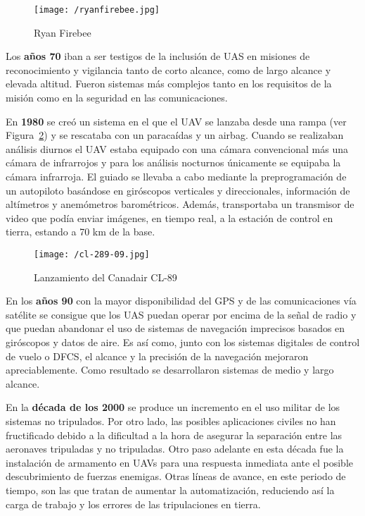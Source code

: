 \begin{figure}[!h]
\begin{center}
\texttt{[image: /ryanfirebee.jpg]}
\caption[Ryan Firebee]{Ryan Firebee}
\label{fig:ryanfirebee}
\end{center}
\end{figure}

Los \textbf{años 70} iban a ser testigos de la inclusión de \acs{UAS} en misiones de 
reconocimiento y vigilancia tanto de corto alcance, como de largo alcance y elevada altitud. Fueron sistemas 
más complejos tanto en los requisitos de la misión como en la seguridad en las comunicaciones.

En \textbf{1980} se creó un sistema en el que el \acs{UAV} se lanzaba desde una rampa (ver Figura~\ref{fig:cl89}) y se rescataba con un paracaídas y un airbag. 
Cuando se realizaban análisis diurnos el \acs{UAV} estaba equipado con una cámara convencional más una cámara de infrarrojos y para los análisis nocturnos únicamente se equipaba la cámara infrarroja. El guiado se llevaba a cabo mediante la preprogramación de un autopiloto basándose en giróscopos verticales y direccionales, información de altímetros y anemómetros barométricos. 
Además, transportaba un transmisor de video que podía enviar imágenes, en tiempo real, a la estación de control 
en tierra, estando a 70 km de la base.

\begin{figure}[!h]
\begin{center}
\texttt{[image: /cl-289-09.jpg]}
\caption[Lanzamiento del Canadair CL-89]{Lanzamiento del Canadair CL-89}
\label{fig:cl89}
\end{center}
\end{figure}

En los \textbf{años 90} con la mayor disponibilidad del \acs{GPS} y de las comunicaciones vía satélite se consigue que los \acs{UAS} puedan operar por encima de la señal de radio y que puedan abandonar el uso de sistemas de navegación imprecisos basados en giróscopos y
datos de aire. Es así como, junto con los sistemas digitales de control de vuelo o \acs{DFCS}, el alcance y la precisión de la navegación mejoraron apreciablemente. 
Como resultado se desarrollaron sistemas de medio y largo alcance. 

En la \textbf{década de los 2000} se produce un incremento en el uso militar de los sistemas no tripulados. 
Por otro lado, las posibles aplicaciones civiles no han fructificado debido a la dificultad a la hora de asegurar la 
separación entre las aeronaves tripuladas y no tripuladas.
Otro paso adelante en esta década fue la instalación de armamento en \acs{UAV}s para una respuesta inmediata ante el posible 
descubrimiento de fuerzas enemigas.
Otras líneas de avance, en este periodo de tiempo, son las que tratan de aumentar la automatización, reduciendo así
la carga de trabajo y los errores de las tripulaciones en tierra.

